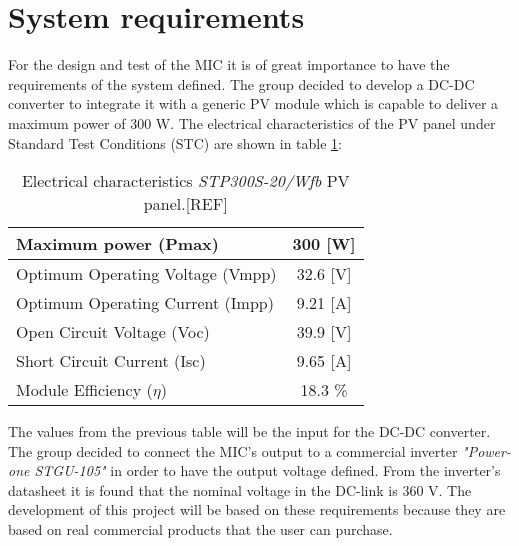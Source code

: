 \section{System requirements}

For the design and test of the MIC it is of great importance to have the requirements of the system defined. The group decided to develop a DC-DC converter to integrate it with a generic PV module which is capable to deliver a maximum power of 300 W. The electrical characteristics of the PV panel under Standard Test Conditions (STC) are shown in table \ref{el_charact_PV_panel}:

\begin{table}[H]
	\centering
	\begin{tabular}{ |l|c| } 
		\hline
		Maximum power (Pmax) & 300 [W]  \\ \hline
		Optimum Operating Voltage (Vmpp) & 32.6 [V]  \\ \hline
		Optimum Operating Current (Impp) & 9.21 [A]  \\ \hline
		Open Circuit Voltage (Voc) &  39.9 [V]\\ \hline
		Short Circuit Current (Isc) & 9.65 [A]  \\ \hline
		Module Efficiency ($\eta$) & 18.3 \%  \\ \hline
	\end{tabular}
	\caption{Electrical characteristics \textit{STP300S-20/Wfb} PV panel.[REF]}
	\label{el_charact_PV_panel}
\end{table}

The values from the previous table will be the input for the DC-DC converter. The group decided to connect the MIC's output to a commercial inverter \textit{"Power-one STGU-105"} in order to have the output voltage defined. From the inverter's datasheet it is found that the nominal voltage in the DC-link is 360 V. 
The development of this project will be based on these requirements because they are based on real commercial products that the user can purchase.


